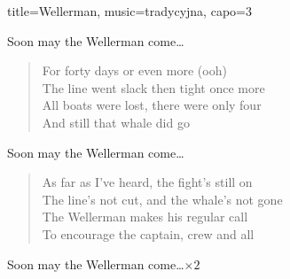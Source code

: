 \begin{song}{title={Wellerman}, music={tradycyjna}, capo=3}
\begin{multicols}{2}
\begin{verse}
    \end{verse}
    \begin{chorus}
        Soon may the Wellerman come\ldots
    \end{chorus}
    \begin{verse}
        For forty days or even more (ooh) \\
        The line went slack then tight once more \\
        All boats were lost, there were only four \\
        And still that whale did go
    \end{verse}
    \begin{chorus}
        Soon may the Wellerman come\ldots
    \end{chorus}
    \begin{verse}
        As far as I've heard, the fight's still on \\
        The line's not cut, and the whale's not gone \\
        The Wellerman makes his regular call \\
        To encourage the captain, crew and all
    \end{verse}
    \begin{chorus}
        Soon may the Wellerman come\ldots $\times 2$
    \end{chorus}
\end{multicols}
\end{song}


